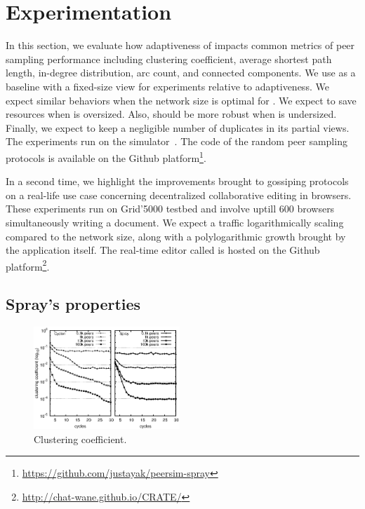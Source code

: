 \section{Experimentation}
\label{sec:experiments}

In this section, we evaluate how adaptiveness of \SPRAY impacts common metrics
of peer sampling performance including clustering coefficient, average shortest
path length, in-degree distribution, arc count, and connected components. We use
\CYCLON as a baseline with a fixed-size view for experiments relative to
adaptiveness. We expect similar behaviors when the network size is optimal for
\CYCLON. We expect \SPRAY to save resources when \CYCLON is oversized. Also,
\SPRAY should be more robust when \CYCLON is undersized. Finally, we expect
\SPRAY to keep a negligible number of duplicates in its partial views. The
experiments run on the \PEERSIM simulator~\cite{montresor2009peersim}. The code
of the random peer sampling protocols is available on the Github
platform\footnote{\url{https://github.com/justayak/peersim-spray}}.

In a second time, we highlight the improvements brought to gossiping protocols
on a real-life use case concerning decentralized collaborative editing in
browsers.  These experiments run on Grid'5000 testbed and involve uptill 600
browsers simultaneously writing a document. We expect a traffic logarithmically
scaling compared to the network size, along with a polylogarithmic growth
brought by the application itself. The real-time editor called \CRATE is hosted
on the Github platform\footnote{\url{http://chat-wane.github.io/CRATE/}}.


\subsection{Spray's properties}

\begin{figure}
  \centering
  \includegraphics[width=0.49\textwidth]{img/simple.eps}
  \caption{\label{fig:clustering}Clustering coefficient.}
\end{figure}

